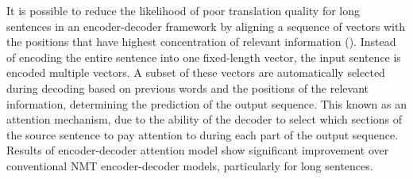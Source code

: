 It is possible to reduce the likelihood of poor translation quality for long sentences in an encoder-decoder framework by aligning a sequence of vectors with the positions that have highest concentration of relevant information (\cite{bahdanau_neural_2016}). 
Instead of encoding the entire sentence into one fixed-length vector, the input sentence is encoded multiple vectors. A subset of these vectors are automatically selected during decoding based on previous words and the positions of the relevant information, determining the prediction of the output sequence. This known as an attention mechanism, due to the ability of the decoder to select which sections of the source sentence to pay attention to during each part of the output sequence. Results of encoder-decoder attention model show significant improvement over conventional \acrshort{NMT} encoder-decoder models, particularly for long sentences.

















